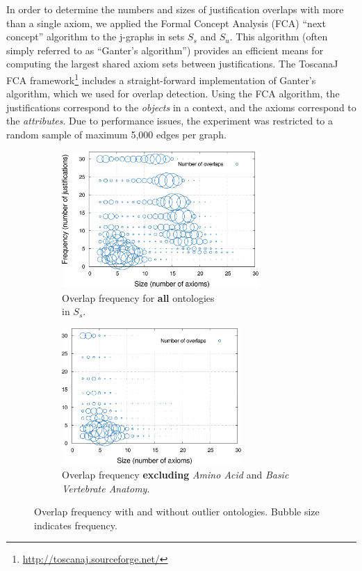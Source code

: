 In order to determine the numbers and sizes of justification overlaps with more than a single axiom, we applied the Formal Concept Analysis (FCA) \cite{ganter05ar} \enquote{next concept} algorithm to the j-graphs in sets $S_{s}$ and $S_{u}$. This algorithm (often simply referred to as \enquote{Ganter's algorithm}) provides an efficient means for computing the largest shared axiom sets between justifications. The ToscanaJ FCA framework\footnote{\url{http://toscanaj.sourceforge.net/}} includes a straight-forward implementation of Ganter's algorithm, which we used for overlap detection. Using the FCA algorithm, the justifications correspond to the \emph{objects} in a  context, and the axioms correspond to the \emph{attributes}. Due to performance issues, the experiment was restricted to a random sample of maximum 5,000 edges per graph. 

\begin{figure}
\centering
		\begin{subfigure}{0.5\textwidth}
                \centering
                \includegraphics[height=5.2cm]{plots/overlap-count-all.pdf}
                \caption{Overlap frequency for \textbf{all} ontologies \\in $S_{s}$.}
        	\label{fig:overlap-all}
        \end{subfigure}%
		\begin{subfigure}{0.5\textwidth}
                \centering
                \includegraphics[height=5.2cm]{plots/overlap-count-reduced.pdf}
                \caption{Overlap frequency \textbf{excluding} \emph{Amino Acid} and \emph{Basic Vertebrate Anatomy}.}
        	\label{fig:overlap-reduced}
        \end{subfigure}
        \caption[Overlap frequency with and without outlier ontologies.]{Overlap frequency with and without outlier ontologies. Bubble size indicates frequency.}
\end{figure}

